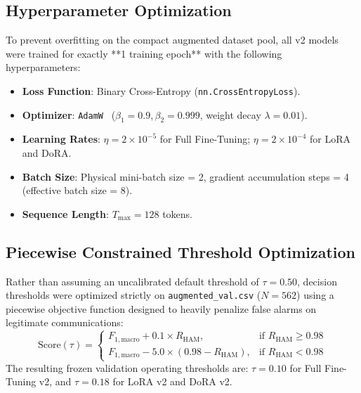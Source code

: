 \documentclass[conference]{IEEEtran}
\begin{document}
\subsection{Hyperparameter Optimization}
To prevent overfitting on the compact augmented dataset pool, all v2 models were trained for exactly **1 training epoch** with the following hyperparameters:
\begin{itemize}
    \item \textbf{Loss Function}: Binary Cross-Entropy (\texttt{nn.CrossEntropyLoss}).
    \item \textbf{Optimizer}: \texttt{AdamW}~\cite{loshchilov2019adamw} ($\beta_1 = 0.9, \beta_2 = 0.999$, weight decay $\lambda = 0.01$).
    \item \textbf{Learning Rates}: $\eta = 2 \times 10^{-5}$ for Full Fine-Tuning; $\eta = 2 \times 10^{-4}$ for LoRA and DoRA.
    \item \textbf{Batch Size}: Physical mini-batch size = 2, gradient accumulation steps = 4 (effective batch size = 8).
    \item \textbf{Sequence Length}: $T_{\max} = 128$ tokens.
\end{itemize}

\subsection{Piecewise Constrained Threshold Optimization}
Rather than assuming an uncalibrated default threshold of $\tau = 0.50$, decision thresholds were optimized strictly on \texttt{augmented\_val.csv} ($N=562$) using a piecewise objective function designed to heavily penalize false alarms on legitimate communications:
\begin{equation}
    \text{Score}(\tau) = 
    \begin{cases} 
        F_{1,\text{macro}} + 0.1 \times R_{\text{HAM}}, & \text{if } R_{\text{HAM}} \ge 0.98 \\ 
        F_{1,\text{macro}} - 5.0 \times (0.98 - R_{\text{HAM}}), & \text{if } R_{\text{HAM}} < 0.98 
    \end{cases}
    \label{eq:threshold_opt}
\end{equation}
The resulting frozen validation operating thresholds are:
$\tau = 0.10$ for Full Fine-Tuning v2, and $\tau = 0.18$ for LoRA v2 and DoRA v2.

\end{document}
